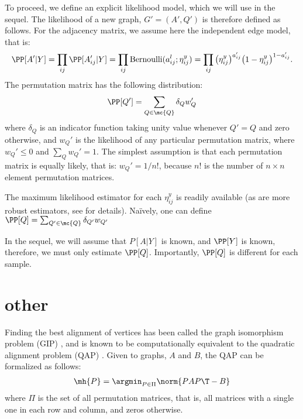 To proceed, we define an explicit likelihood model, which we will use in the sequel.  The likelihood of a new graph, $G'=(A',Q')$ is therefore defined as follows. For the adjacency matrix, we assume here the independent edge model, that is:
\begin{align}
\PP[A'|Y] = \prod_{ij} \PP[A_{ij}'| Y]	= \prod_{ij} \text{Bernoulli}(a_{ij}^l; \eta_{ij}^y) = \prod_{ij} \big(\eta_{ij}^y\big)^{a_{ij}'}\big(1-\eta_{ij}^y\big)^{1-a_{ij}'}.
\end{align}
The permutation matrix has the following distribution:
\begin{align}
	\PP[Q'] = \sum_{Q \in \mc{Q}} \delta_Q w_{Q}'
\end{align}
where $\delta_Q$ is an indicator function taking unity value whenever $Q'=Q$ and zero otherwise, and $w_Q'$ is the likelihood of any particular permutation matrix, where $w_Q'\leq 0$ and $\sum_{Q}w_Q'=1$.  The simplest assumption is that each permutation matrix is equally likely, that is: $w_Q'=1/n!$, because $n!$ is the number of $n\times n$ element permutation matrices.  




The maximum likelihood estimator for each $\eta_{ij}^y$ is readily available (as are more robust estimators, see \cite{??} for details).  Na\"ively, one can define $\PP[Q]=\sum_{Q' \in \mc{Q}} \delta_{Q'} w_{Q'}$

In the sequel, we will assume that $P[A|Y]$ is known, and $\PP[Y]$ is known, therefore, we must only estimate $\PP[Q]$.  Importantly, $\PP[Q]$ is different for each sample.  










\section{other} %
\label{sec:other}





Finding the best alignment of vertices has been called the graph isomorphism problem (GIP) \cite{??}, and is known to be computationally equivalent to the quadratic alignment problem (QAP) \cite{??}.  Given to graphs, $A$ and $B$, the QAP can be formalized as follows:
\begin{align}
	\mh{P} = \argmin_{P \in \Pi} \norm{PAP\T - B}
\end{align}
where $\Pi$ is the set of all permutation matrices, that is, all matrices with a single one in each row and column, and zeros otherwise.  


